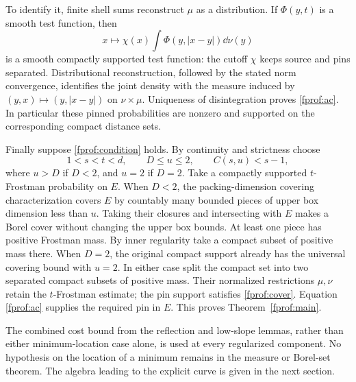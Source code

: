 To identify it, finite shell sums reconstruct \(\mu\) as a distribution. If \(\Phi(y,t)\) is a smooth test function, then
$$
 x\longmapsto\chi(x)\int\Phi(y,|x-y|)\dd\nu(y)
$$
is a smooth compactly supported test function: the cutoff \(\chi\) keeps source and pins separated. Distributional reconstruction, followed by the stated norm convergence, identifies the joint density with the measure induced by \((y,x)\mapsto(y,|x-y|)\) on \(\nu\times\mu\). Uniqueness of disintegration proves \eqref{fprof:ac}. In particular these pinned probabilities are nonzero and supported on the corresponding compact distance sets.

Finally suppose \eqref{fprof:condition} holds. By continuity and strictness choose
$$
 1<s<t<d,\qquad D\leq u\leq2,\qquad C(s,u)<s-1,
$$
where \(u>D\) if \(D<2\), and \(u=2\) if \(D=2\). Take a compactly supported \(t\)-Frostman probability on \(E\). When \(D<2\), the packing-dimension covering characterization covers \(E\) by countably many bounded pieces of upper box dimension less than \(u\). Taking their closures and intersecting with \(E\) makes a Borel cover without changing the upper box bounds. At least one piece has positive Frostman mass. By inner regularity take a compact subset of positive mass there. When \(D=2\), the original compact support already has the universal covering bound with \(u=2\). In either case split the compact set into two separated compact subsets of positive mass. Their normalized restrictions \(\mu,\nu\) retain the \(t\)-Frostman estimate; the pin support satisfies \eqref{fprof:cover}. Equation \eqref{fprof:ac} supplies the required pin in \(E\). This proves Theorem~\ref{fprof:main}.

The combined cost bound from the reflection and low-slope lemmas, rather than
either minimum-location case alone, is used at every regularized component. No hypothesis on the location
of a minimum remains in the measure or Borel-set theorem. The algebra leading
to the explicit curve is given in the next section.
